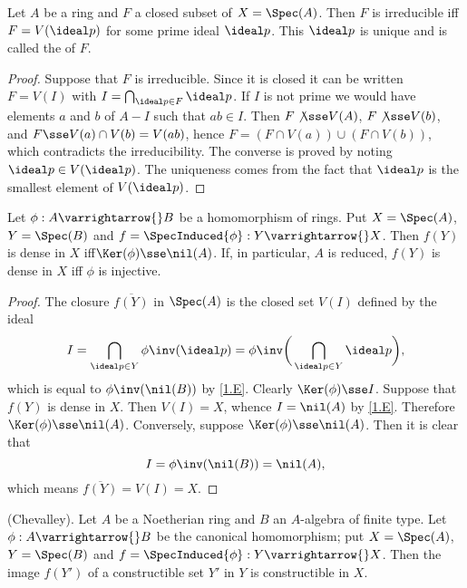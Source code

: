 \documentclass[../main]{subfiles}
\begin{document}
\begin{parlemma}\label{lem:06.01}
Let $A$ be a ring and $F$ a closed subset of $X= \Spec(A)$. Then $F$ is irreducible iff $F=V(\ideal p)$ for some prime ideal $\ideal p$. This $\ideal p$ is unique and is called the  of $F$.
\end{parlemma}

\begin{proof} Suppose that $F$ is irreducible. Since it is closed it can be written $F=V( I)$ with $ I = \bigcap_{\ideal p \in F} \ideal p$. If $ I$ is not prime we would have elements $a$ and $b$ of $A -  I$ such that $ab \in  I$. Then 
$F \not \sse V(A)$, $F \not \sse V(b)$, and $F \sse V(a) \cap V(b) = V(ab)$, hence $F = (F \cap V(a)) \cup (F \cap V(b))$, which contradicts the irreducibility. The converse is proved by noting $\ideal p \in V(\ideal p)$. The uniqueness comes from the fact that $\ideal p$ is the smallest element of $V(\ideal p)$.
\end{proof}

\begin{lemma}\label{lem:06.02} 
Let $\phi : A \varrightarrow{} B$ be a homomorphism of rings. Put $X = \Spec(A)$, $Y=\Spec(B)$ and $f = \SpecInduced{\phi}: Y \varrightarrow{} X$. Then $f(Y)$ is dense in $X$ iff\newline $\Ker(\phi) \sse \nil(A)$. If, in particular, $A$ is reduced, $f(Y)$ is dense in $X$ iff $\phi$ is injective.
\end{lemma}

\begin{proof} The closure $\overline{f(Y)}$ in $\Spec(A)$ is the closed set $V( I)$ defined by the ideal
\[
I = \bigcap_{\ideal p \in Y} \phi \inv (\ideal p) = \phi \inv \bigg(\bigcap_{\ideal p \in Y} \ideal p \bigg),
\]
which is equal to $\phi\inv (\nil(B))$ by \ref{1.E}. Clearly $\Ker(\phi) \sse  I$. Suppose that $f(Y)$ is dense in $X$. Then $V( I) = X$, whence $ I = \nil(A)$ by \ref{1.E}. Therefore \newline $\Ker(\phi) \sse \nil(A)$. Conversely, suppose $\Ker(\phi) \sse \nil(A)$. Then it is clear that 
\[
 I = \phi \inv (\nil(B)) = \nil(A),
\]
which means $\overline{f(Y)} = V( I ) = X$.
\end{proof}
\begin{partheorem}\label{thm:006}
(Chevalley). Let $A$ be a Noetherian ring and $B$ an $A$-algebra of finite type. Let $\phi : A \varrightarrow{} B$ be the canonical homomorphism; put $X = \Spec(A)$, $Y = \Spec(B)$ and $f= \SpecInduced{\phi}: Y \varrightarrow{} X$. Then the image $f(Y')$ of a constructible set $Y'$ in $Y$ is constructible in $X$.
\end{partheorem}
\end{document}
